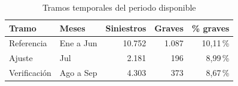 \begin{table}[htbp]
\centering
\small
\caption{Tramos temporales del periodo disponible}
\label{tab:a6}
\begin{tabular}{llrrr}
\toprule
Tramo & Meses & Siniestros & Graves & \% graves \\
\midrule
Referencia & Ene a Jun & 10.752 & 1.087 & 10,11\,\% \\
Ajuste & Jul & 2.181 & 196 & 8,99\,\% \\
Verificación & Ago a Sep & 4.303 & 373 & 8,67\,\% \\
\bottomrule
\end{tabular}
\par\vspace{2pt}{\footnotesize Los tramos respetan el orden temporal: los meses de verificación son posteriores a los demás (criterios CA-04 y CA-05). Cálculo propio (Anexo B).}
\end{table}
